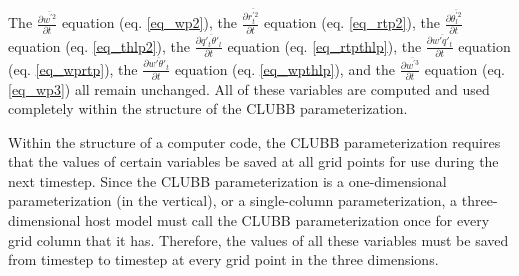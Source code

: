 \documentclass[11pt,fleqn]{article}
\newcommand{\ptlder}[2]{\frac{\partial #1}{\partial #2}}
\begin{document}
The $\ptlder{\overline{w^{'2}}}{t}$ equation (eq. \ref{eq_wp2}),
the $\ptlder{\overline{r_t^{'2}}}{t}$ equation (eq. \ref{eq_rtp2}),
the $\ptlder{\overline{\theta_l^{'2}}}{t}$ equation (eq. \ref{eq_thlp2}),
the $\ptlder{\overline{q'_t\theta'_l}}{t}$ equation (eq. \ref{eq_rtpthlp}),
the $\ptlder{\overline{w'q'_t}}{t}$ equation (eq. \ref{eq_wprtp}),
the $\ptlder{\overline{w'\theta'_t}}{t}$ equation (eq. \ref{eq_wpthlp}),
and the $\ptlder{\overline{w^{'3}}}{t}$ equation (eq. \ref{eq_wp3})
all remain unchanged.  All of these variables are computed and used completely
within the structure of the CLUBB parameterization.

Within the structure of a computer code, the CLUBB parameterization requires that
the values of certain variables be saved at all grid points for use during the
next timestep.  Since the CLUBB parameterization is a one-dimensional 
parameterization (in the vertical), or a single-column parameterization, a
three-dimensional host model must call the CLUBB parameterization once for every
grid column that it has.  Therefore, the values of all these variables must be
saved from timestep to timestep at every grid point in the three dimensions.
\end{document}
